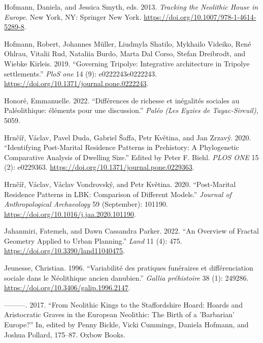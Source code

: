 \documentclass[
  12pt,
  a4paper, twoside]{book}
\newlength{\cslhangindent}
\newlength{\cslentryspacingunit} %
\newenvironment{CSLReferences}[2] %
 {%
  \setlength{\parindent}{0pt}
  \ifodd #1
  \let\oldpar\par
  \def\par{\hangindent=\cslhangindent\oldpar}
  \fi
  \setlength{\parskip}{#2\cslentryspacingunit}
 }%
 {}
\begin{document}
\begin{CSLReferences}{1}{0}
\leavevmode{}%
Hofmann, Daniela, and Jessica Smyth, eds. 2013. \emph{Tracking the Neolithic House in Europe}. New York, NY: Springer New York. \url{https://doi.org/10.1007/978-1-4614-5289-8}.

\leavevmode{}%
Hofmann, Robert, Johannes Müller, Liudmyla Shatilo, Mykhailo Videiko, René Ohlrau, Vitalii Rud, Nataliia Burdo, Marta Dal Corso, Stefan Dreibrodt, and Wiebke Kirleis. 2019. {``Governing Tripolye: Integrative architecture in Tripolye settlements.''} \emph{PloS one} 14 (9): e0222243e0222243. \url{https://doi.org/10.1371/journal.pone.0222243}.

\leavevmode{}%
Honoré, Emmanuelle. 2022. {``Différences de richesse et inégalités sociales au Paléolithique: éléments pour une discussion.''} \emph{Paléo (Les Eyzies de Tayac-Sireuil)}, 5059.

\leavevmode{}%
Hrnčíř, Václav, Pavel Duda, Gabriel Šaffa, Petr Květina, and Jan Zrzavý. 2020. {``Identifying Post-Marital Residence Patterns in Prehistory: A Phylogenetic Comparative Analysis of Dwelling Size.''} Edited by Peter F. Biehl. \emph{PLOS ONE} 15 (2): e0229363. \url{https://doi.org/10.1371/journal.pone.0229363}.

\leavevmode{}%
Hrnčíř, Václav, Václav Vondrovský, and Petr Květina. 2020. {``Post-Marital Residence Patterns in LBK: Comparison of Different Models.''} \emph{Journal of Anthropological Archaeology} 59 (September): 101190. \url{https://doi.org/10.1016/j.jaa.2020.101190}.

\leavevmode{}%
Jahanmiri, Fatemeh, and Dawn Cassandra Parker. 2022. {``An Overview of Fractal Geometry Applied to Urban Planning.''} \emph{Land} 11 (4): 475. \url{https://doi.org/10.3390/land11040475}.

\leavevmode{}%
Jeunesse, Christian. 1996. {``Variabilité des pratiques funéraires et différenciation sociale dans le Néolithique ancien danubien.''} \emph{Gallia préhistoire} 38 (1): 249286. \url{https://doi.org/10.3406/galip.1996.2147}.

\leavevmode{}%
---------. 2017. {``From Neolithic Kings to the Staffordshire Hoard: Hoards and Aristocratic Graves in the European Neolithic: The Birth of a 'Barbarian' Europe?''} In, edited by Penny Bickle, Vicki Cummings, Daniela Hofmann, and Joshua Pollard, 175--87. Oxbow Books.


\end{CSLReferences}
\end{document}
